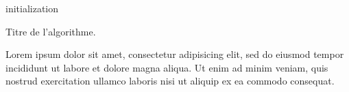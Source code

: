 \begin{algorithm}[H]
initialization\;
\caption{Titre de l'algorithme.}
\label{algo:algo_1}
\end{algorithm}

Lorem ipsum dolor sit amet, consectetur adipisicing elit, sed do eiusmod
tempor incididunt ut labore et dolore magna aliqua. Ut enim ad minim veniam,
quis nostrud exercitation ullamco laboris nisi ut aliquip ex ea commodo
consequat.

